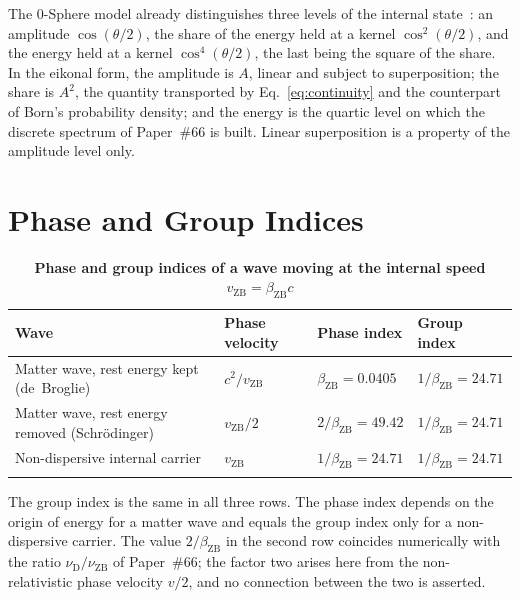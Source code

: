 \documentclass[%
 reprint, amsmath,amssymb, aps, prb, ]{revtex4-2}
\numberwithin{equation}{section}
\newcommand{\iphase}{\theta}  %
\newcommand{\bZB}{\beta_{\mathrm{ZB}}}
\begin{document}
The 0-Sphere model already distinguishes three levels of the internal state~\cite{H65, H66}: an amplitude $\cos(\iphase/2)$, the share of the energy held at a kernel $\cos^2(\iphase/2)$, and the energy held at a kernel $\cos^4(\iphase/2)$, the last being the square of the share. In the eikonal form, the amplitude is $A$, linear and subject to superposition; the share is $A^2$, the quantity transported by Eq.~\eqref{eq:continuity} and the counterpart of Born's probability density; and the energy is the quartic level on which the discrete spectrum of Paper~\#66 is built. Linear superposition is a property of the amplitude level only.


\section{Phase and Group Indices}
\label{sec:indices}

\begin{table}[t!]
\centering
\caption{\textbf{Phase and group indices of a wave moving at the internal speed $v_{\mathrm{ZB}} = \bZB c$}}
\label{tab:indices}
\renewcommand{\arraystretch}{1.4}
\begin{tabular}{p{5.2cm}p{3.4cm}p{3.0cm}p{3.9cm}}
\toprule
\textbf{Wave} & \textbf{Phase velocity} & \textbf{Phase index} & \textbf{Group index} \\
\midrule
\raggedright Matter wave, rest energy kept (de~Broglie)
& \raggedright $c^2/v_{\mathrm{ZB}}$
& \raggedright $\bZB = 0.0405$
& \raggedright $1/\bZB = 24.71$ \tabularnewline
\addlinespace[0.3cm]
\raggedright Matter wave, rest energy removed (Schr\"odinger)
& \raggedright $v_{\mathrm{ZB}}/2$
& \raggedright $2/\bZB = 49.42$
& \raggedright $1/\bZB = 24.71$ \tabularnewline
\addlinespace[0.3cm]
\raggedright Non-dispersive internal carrier
& \raggedright $v_{\mathrm{ZB}}$
& \raggedright $1/\bZB = 24.71$
& \raggedright $1/\bZB = 24.71$ \tabularnewline
\addlinespace[0.2cm]
\bottomrule
\end{tabular}
\vspace{0.2cm}
\begin{minipage}{0.95\textwidth}
\justifying\footnotesize
The group index is the same in all three rows. The phase index depends on the origin of energy for a matter wave and equals the group index only for a non-dispersive carrier. The value $2/\bZB$ in the second row coincides numerically with the ratio $\nu_{\mathrm{D}}/\nu_{\mathrm{ZB}}$ of Paper~\#66; the factor two arises here from the non-relativistic phase velocity $v/2$, and no connection between the two is asserted.
\end{minipage}
\end{table}
\end{document}
